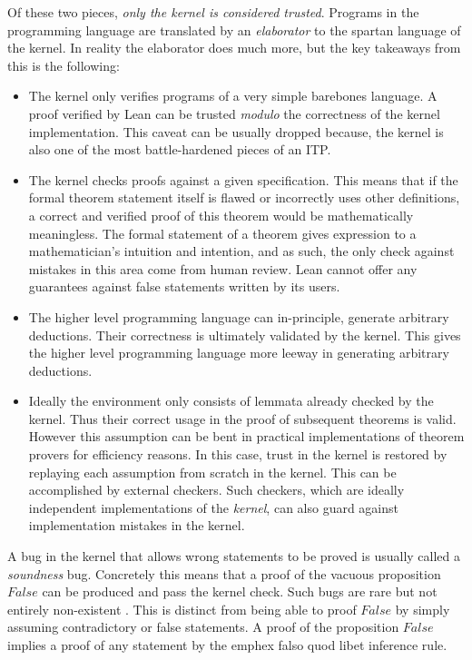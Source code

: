 Of these two pieces, \emph{only the kernel is considered trusted}. Programs in the programming language are translated by an \emph{elaborator} to the spartan language of the kernel. In reality the elaborator does much more, but the key takeaways from this is the following:
\begin{itemize}
    \item The kernel only verifies programs of a very simple barebones language. A proof verified by Lean can be trusted \emph{modulo} the correctness of the kernel implementation. This caveat can be usually dropped because, the kernel is also one of the most battle-hardened pieces of an ITP.
    \item The kernel checks proofs against a given specification. This means that if the formal theorem statement itself is flawed or incorrectly uses other definitions, a correct and verified proof of this theorem would be mathematically meaningless. The formal statement of a theorem gives expression to a mathematician's intuition and intention, and as such, the only check against mistakes in this area come from human review. Lean cannot offer any guarantees against false statements written by its users.
    \item The higher level programming language can in-principle, generate arbitrary deductions. Their correctness is ultimately validated by the kernel. This gives the higher level programming language more leeway in generating arbitrary deductions.
    \item Ideally the environment only consists of lemmata already checked by the kernel. Thus their correct usage in the proof of subsequent theorems is valid. However this assumption can be bent in practical implementations of theorem provers for efficiency reasons. In this case, trust in the kernel is restored by replaying each assumption from scratch in the kernel. This can be accomplished by external checkers. Such checkers, which are ideally independent implementations of the \emph{kernel}, can also guard against implementation mistakes in the kernel.
\end{itemize}

\begin{remark}
    A bug in the kernel that allows wrong statements to be proved is usually called a \emph{soundness} bug. Concretely this means that a proof of the vacuous proposition $False$ can be produced and pass the kernel check. Such bugs are rare but not entirely non-existent . This is distinct from being able to proof $False$ by simply assuming contradictory or false statements. A proof of the proposition $False$ implies a proof of any statement by the emph{ex falso quod libet} inference rule.

\end{remark}

